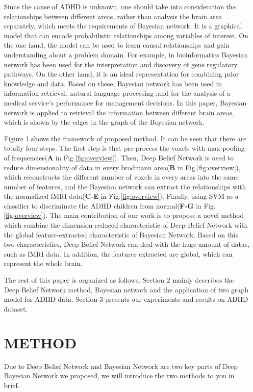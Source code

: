 \documentclass[10pt,twocolumn,letterpaper]{article}
\begin{document}
Since the cause of ADHD is unknown, one should take into consideration the relationships between different areas, rather than analysis the brain area separately, which meets the requirements of Bayesian network. It is a graphical model that can encode probabilistic relationships among variables of interest. On the one hand, the model can be used to learn causal relationships and gain understanding about a problem domain. For example, in bioinformatics Bayesian network has been used for the interpretation and discovery of gene regulatory pathways\cite{14}. On the other hand, it is an ideal representation for combining prior knowledge and data. Based on these, Bayesian network has been used in information retrieval\cite{15}, natural language processing\cite{16} ,and for the analysis of a medical service's performance for management decisions\cite{17}. In this paper, Bayesian network is applied to retrieval the information between different brain areas, which is shown by the edges in the graph of the Bayesian network.  

 
Figure 1 shows the framework of proposed method. It can be seen that there are totally four steps. The first step is that pre-process the
voxels with max-pooling of frequencies(\textbf{A} in Fig.\ref{fig:overview}). Then, Deep Belief Network is used to reduce dimensionality of data in every brodmann area(\textbf{B} in Fig.\ref{fig:overview}), which reconstructs the different number of voxels in every areas into the same number of features, and the Bayesian network can extract the relationships with the normalized fMRI data(\textbf{C-E} in Fig.\ref{fig:overview}). Finally, using SVM as a classifier to discriminate the ADHD children from normal(\textbf{F-G} in Fig.\ref{fig:overview}). The main contribution of our work is to propose a novel method which combine the dimension-reduced characteristic of Deep Belief Network with the global feature-extracted  characteristic of Bayesian Network. Based on this two characteristics, Deep Belief Network can deal with the huge amount of datas, such as fMRI data. In addition, the features extracted are global, which can represent the whole brain.

The rest of this paper is organized as follows. Section 2 mainly describes the Deep Belief Network method, Bayesian network and the application of two graph model for ADHD data. Section 3 presents our experiments and results on ADHD dataset.

\section{METHOD}
Due to Deep Belief Network and Bayesian Network are two key parts of Deep Bayesian Network we proposed, we will introduce the two methods to you in brief.
\end{document}

